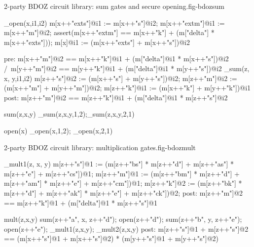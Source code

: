\begin{fpfig}[t]{2-party BDOZ circuit library: sum gates and secure opening.}{fig-bdozsum}
{\footnotesize
\begin{verbatimtab}
  _open(x,i1,i2){
    m[x++"exts"]@i1 := m[x++"s"]@i2;
    m[x++"extm"]@i1 := m[x++"m"]@i2;
    assert(m[x++"extm"] == m[x++"k"] + (m["delta"] * m[x++"exts"]));
    m[x]@i1 := (m[x++"exts"] + m[x++"s"])@i2
  }
  
  pre: { m[x++"m"]@i2 == m[x++"k"]@i1 + (m["delta"]@i1 * m[x++"s"])@i2 /\
         m[y++"m"]@i2 == m[y++"k"]@i1 + (m["delta"]@i1 * m[y++"s"])@i2 }
  _sum(z, x, y,i1,i2) {
      m[z++"s"]@i2 := (m[x++"s"] + m[y++"s"])@i2;
      m[z++"m"]@i2 := (m[x++"m"] + m[y++"m"])@i2;
      m[z++"k"]@i1 := (m[x++"k"] + m[y++"k"])@i1
  }
  post: { m[z++"m"]@i2 == m[z++"k"]@i1 + (m["delta"]@i1 * m[z++"s"]@i2 } 
  
  sum(z,x,y) { _sum(z,x,y,1,2);_sum(z,x,y,2,1) }

  open(x) { _open(x,1,2); _open(x,2,1) }
\end{verbatimtab}
}
\end{fpfig}

\begin{fpfig}[t]{2-party BDOZ circuit library: multiplication gates.}{fig-bdozmult}
{\footnotesize
\begin{verbatimtab}
  _mult1(z, x, y) {
      m[z++"s"]@1 :=
        (m[z++"bs"] * m[z++"d"] + m[z++"as"] * m[z++"e"] + m[z++"cs"])@1;
      m[z++"m"]@1 :=
        (m[z++"bm"] * m[z++"d"] + m[z++"am"] * m[z++"e"] + m[z++"cm"])@1;
      m[z++"k"]@2 :=
        (m[z++"bk"] * m[z++"d"] + m[z++"ak"] * m[z++"e"] + m[z++"ck"])@2;    
  }
  post: { m[z++"m"]@2 == m[z++"k"]@1 + (m["delta"]@1 * m[z++"s"]@1 }

  mult(z,x,y) {
      sum(z++"a", x, z++"d");
      open(z++"d");
      sum(z++"b", y, z++"e");
      open(z++"e"); 
      _mult1(z,x,y); _mult2(z,x,y)
  }
  post: {  m[z++"s"]@1 + m[z++"s"]@2 ==
          (m[x++"s"]@1 + m[x++"s"]@2) * (m[y++"s"]@1 + m[y++"s"]@2)} 
  
\end{verbatimtab}
}
\end{fpfig}

\begin{comment}
      m[z++"ds"]@1 as m[x++"s"]@2 + r[z++"as"]@2;
      m[z++"ds"]@2 as m[x++"s"]@1 + r[z++"as"]@1;
      m[z++"ms"]@2 as m[z++"k"]@1 + (m["delta"]@1 * m[z++"ds"]@2);
      m[z++"ms"]@1 as m[z++"k"]@2 + (m["delta"]@2 * m[z++"ds"]@1);
\end{comment}
